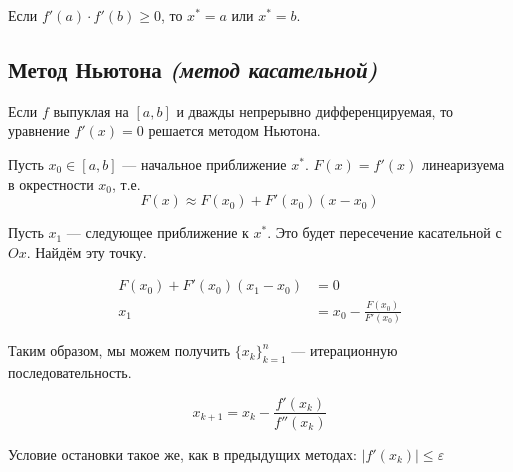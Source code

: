 \documentclass[12pt, a4paper, oneside]{book}
\begin{document}
\begin{remark}
    Если \(f'(a) \cdot f'(b) \geq 0\), то \(x^* = a\) или \(x^* = b\).
\end{remark}

\subsection{Метод Ньютона \textit{(метод касательной)}}

Если \(f\) выпуклая на \([a, b]\) и дважды непрерывно дифференцируемая, то уравнение \(f'(x) = 0\) решается методом Ньютона.

Пусть \(x_0 \in [a, b]\) --- начальное приближение \(x^*\). \(F(x) = f'(x)\) линеаризуема в окрестности \(x_0\), т.е.
\begin{equation}
    F(x) \approx F(x_0) + F'(x_0)(x - x_0)
\end{equation}

Пусть \(x_1\) --- следующее приближение к \(x^*\). Это будет пересечение касательной с \(Ox\). Найдём эту точку.

\begin{align*}
    F(x_0) + F'(x_0) (x_1 - x_0) & = 0                            \\
    x_1                          & = x_0 - \frac{F(x_0)}{F'(x_0)}
\end{align*}

Таким образом, мы можем получить \(\{x_k\}_{k = 1}^{n}\) --- итерационную последовательность.

\[x_{k+1} = x_k - \frac{f'(x_k)}{f''(x_k)} \]

Условие остановки такое же, как в предыдущих методах: \(|f'(x_k)| \leq \varepsilon\)
\end{document}
